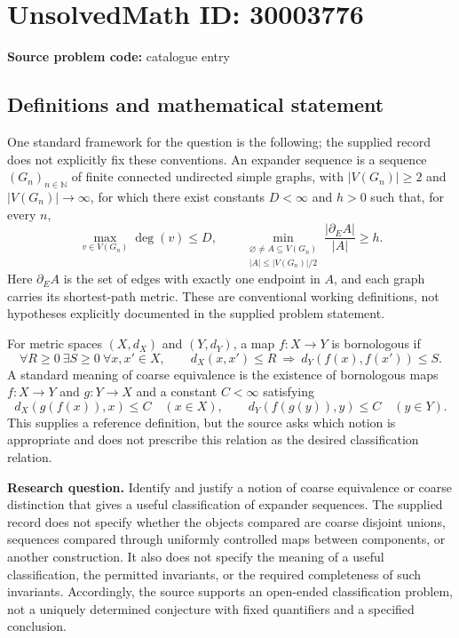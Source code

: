 \documentclass[11pt]{article}
\newcommand{\N}{\mathbb{N}}
\begin{document}
\section*{UnsolvedMath ID: 30003776}
\textbf{Source problem code:} catalogue entry
\subsection{Definitions and mathematical statement}
One standard framework for the question is the following; the supplied record does not explicitly fix these conventions. An expander sequence is a sequence \((G_n)_{n\in\N}\) of finite connected undirected simple graphs, with \(|V(G_n)|\geq 2\) and \(|V(G_n)|\to\infty\), for which there exist constants \(D<\infty\) and \(h>0\) such that, for every \(n\),
\[
\max_{v\in V(G_n)}\deg(v)\leq D,
\qquad
\min_{\substack{\varnothing\ne A\subseteq V(G_n)\\ |A|\leq |V(G_n)|/2}}
\frac{|\partial_E A|}{|A|}\geq h.
\]
Here \(\partial_E A\) is the set of edges with exactly one endpoint in \(A\), and each graph carries its shortest-path metric. These are conventional working definitions, not hypotheses explicitly documented in the supplied problem statement.

For metric spaces \((X,d_X)\) and \((Y,d_Y)\), a map \(f:X\to Y\) is bornologous if
\[
\forall R\geq 0\ \exists S\geq 0\ \forall x,x'\in X,
\qquad d_X(x,x')\leq R\ \Longrightarrow\ d_Y(f(x),f(x'))\leq S.
\]
A standard meaning of coarse equivalence is the existence of bornologous maps \(f:X\to Y\) and \(g:Y\to X\) and a constant \(C<\infty\) satisfying
\[
 d_X(g(f(x)),x)\leq C\quad(x\in X),
 \qquad
 d_Y(f(g(y)),y)\leq C\quad(y\in Y).
\]
This supplies a reference definition, but the source asks which notion is appropriate and does not prescribe this relation as the desired classification relation.

\textbf{Research question.} Identify and justify a notion of coarse equivalence or coarse distinction that gives a useful classification of expander sequences. The supplied record does not specify whether the objects compared are coarse disjoint unions, sequences compared through uniformly controlled maps between components, or another construction. It also does not specify the meaning of a useful classification, the permitted invariants, or the required completeness of such invariants. Accordingly, the source supports an open-ended classification problem, not a uniquely determined conjecture with fixed quantifiers and a specified conclusion.
\end{document}
